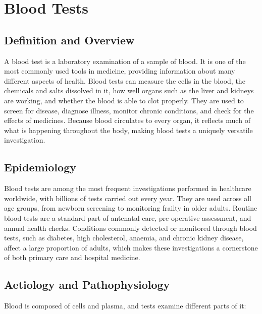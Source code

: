 \chapter{Blood Tests}

\section*{Definition and Overview}
A blood test is a laboratory examination of a sample of blood. It is one of the most commonly used tools in medicine, providing information about many different aspects of health. Blood tests can measure the cells in the blood, the chemicals and salts dissolved in it, how well organs such as the liver and kidneys are working, and whether the blood is able to clot properly. They are used to screen for disease, diagnose illness, monitor chronic conditions, and check for the effects of medicines. Because blood circulates to every organ, it reflects much of what is happening throughout the body, making blood tests a uniquely versatile investigation.

\section*{Epidemiology}
Blood tests are among the most frequent investigations performed in healthcare worldwide, with billions of tests carried out every year. They are used across all age groups, from newborn screening to monitoring frailty in older adults. Routine blood tests are a standard part of antenatal care, pre-operative assessment, and annual health checks. Conditions commonly detected or monitored through blood tests, such as diabetes, high cholesterol, anaemia, and chronic kidney disease, affect a large proportion of adults, which makes these investigations a cornerstone of both primary care and hospital medicine.

\section*{Aetiology and Pathophysiology}
Blood is composed of cells and plasma, and tests examine different parts of it:

